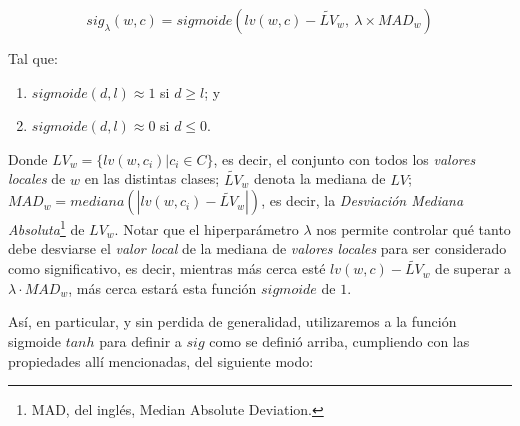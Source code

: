$$sig_{\lambda}(w, c) = sigmoide\left(lv(w, c) - \widetilde{LV}_w, \ \lambda\times MAD_w\right)$$

Tal que:
\begin{enumerate}
    \item[(I)] $sigmoide(d, l)\approx 1$ si $d\geq l$; y
    \item[(II)] $sigmoide(d, l)\approx 0$ si $d\leq0$.
\end{enumerate}

Donde $LV_w = \{lv(w, c_i) | c_i\in C\}$, es decir, el conjunto con todos los  \emph{valores locales} de $w$ en las distintas clases;
$\widetilde{LV}_w$ denota la mediana de $LV$;
$MAD_w = mediana(|lv(w,c_i)-\widetilde{LV}_w|)$, es decir, la \emph{Desviación Mediana Absoluta}\footnote{MAD, del inglés, Median Absolute Deviation.} de $LV_w$.
Notar que el hiperparámetro $\lambda$
nos permite controlar qué tanto debe desviarse el \emph{valor local} de la mediana de \emph{valores locales} para ser considerado como significativo, es decir, mientras más cerca esté $lv(w, c)-\widetilde{LV}_w$ de superar a $\lambda\cdot MAD_w$, más cerca estará esta función $sigmoide$ de $1$.

Así, en particular, y sin perdida de generalidad, utilizaremos a la función sigmoide $tanh$ para definir a $sig$ como se definió arriba, cumpliendo con las propiedades allí mencionadas, del siguiente modo:

